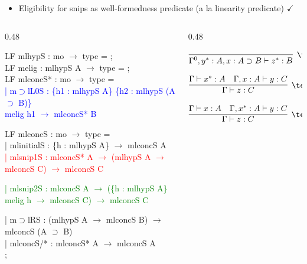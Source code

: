 \documentclass[9ps]{beamer}
\begin{document}
\begin{frame}{}
\begin{itemize}
    \item Eligibility for snips as well-formedness predicate (a la linearity predicate) $\checkmark$ 
\end{itemize}

\begin{columns}

\begin{column}{0.48\textwidth}

\scriptsize
\ttfamily

LF mlhypS : mo $\to$ type = ;\\
LF melig : mlhypS A $\to$ type = ;\\[4pt]

LF mlconcS* : mo $\to$ type =\\[2pt]

\quad \textcolor{blue}{| m$\supset$lL0S : \{h1 : mlhypS A\} \{h2 : mlhypS (A $\supset$ B)\}\\
\quad\quad melig h1 $\to$ mlconcS* B\\[6pt]}

LF mlconcS : mo $\to$ type =\\[2pt]

\quad | mlinitialS : \{h : mlhypS A\} $\to$ mlconcS A\\[2pt]

\quad \textcolor{red}{| mlsnip1S : mlconcS* A $\to$ (mlhypS A $\to$ mlconcS C) $\to$ mlconcS C\\[2pt]}

\quad \textcolor{green}{| mlsnip2S : mlconcS A $\to$ (\{h : mlhypS A\} melig h $\to$ mlconcS C) $\to$ mlconcS C\\[2pt]}

\quad | m$\supset$lRS : (mlhypS A $\to$ mlconcS B) $\to$ mlconcS (A $\supset$ B)\\[2pt]

\quad | mlconcS/* : mlconcS* A $\to$ mlconcS A\\

;

\end{column}

\begin{column}{0.48\textwidth}

$$\infer[\textcolor{blue}{\supset L^0}]{\Gamma^0, y^* : A, x : A \supset B \vdash z^* : B}{}$$

$$\infer[\textcolor{red}{\textrm{Snip}^1_A}]{\Gamma \vdash z : C}{\Gamma \vdash x^* : A & \Gamma, x : A \vdash y : C}$$

$$\infer[\textcolor{green}{\textrm{Snip}^2_A}]{\Gamma \vdash z : C}{\Gamma \vdash x : A & \Gamma, x^*: A \vdash y : C}$$
\end{column}

\end{columns}

\end{frame}
\end{document}

